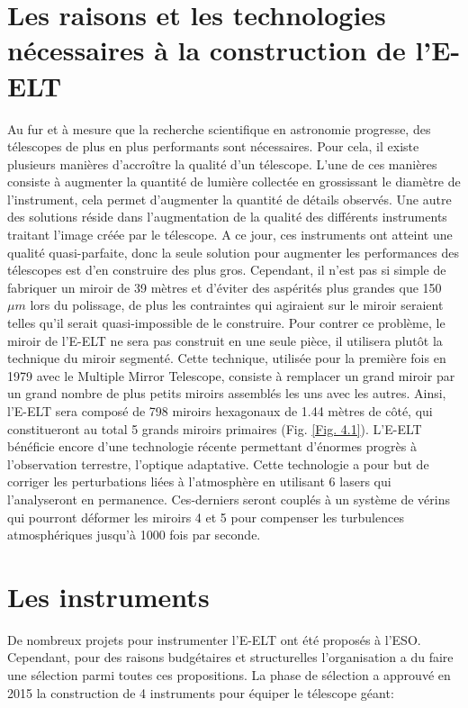 \section{Les raisons et les technologies nécessaires à la construction de l'E-ELT}\label{4.1}

Au fur et à mesure que la recherche scientifique en astronomie progresse, des télescopes de plus en plus performants sont nécessaires. Pour cela, il existe plusieurs manières d'accroître la qualité d'un télescope. L'une de ces manières consiste à augmenter la quantité de lumière collectée en grossissant le diamètre de l'instrument, cela permet d'augmenter la quantité de détails observés. Une autre des solutions réside dans l'augmentation de la qualité des différents instruments traitant l'image créée par le télescope. A ce jour, ces instruments ont atteint une qualité quasi-parfaite, donc la seule solution pour augmenter les performances des télescopes est d'en construire des plus gros. Cependant, il n'est pas si simple de fabriquer un miroir de 39 mètres et d'éviter des aspérités plus grandes que 150 $\mu m$ lors du polissage, de plus les contraintes qui agiraient sur le miroir seraient telles qu'il serait quasi-impossible de le construire. Pour contrer ce problème, le miroir de l'E-ELT ne sera pas construit en une seule pièce, il utilisera plutôt la technique du miroir segmenté. Cette technique, utilisée pour la première fois en 1979 avec le Multiple Mirror Telescope, consiste à remplacer un grand miroir par un grand nombre de plus petits miroirs assemblés les uns avec les autres. Ainsi, l'E-ELT sera composé de 798 miroirs hexagonaux de 1.44 mètres de côté, qui constitueront au total 5 grands miroirs primaires (Fig. \ref{Fig. 4.1}). L'E-ELT bénéficie encore d'une technologie récente permettant d'énormes progrès à l'observation terrestre, l'optique adaptative. Cette technologie a pour but de corriger les perturbations liées à l'atmosphère en utilisant 6 lasers qui l'analyseront en permanence. Ces-derniers seront couplés à un système de vérins qui pourront déformer les miroirs 4 et 5 pour compenser les turbulences atmosphériques jusqu'à 1000 fois par seconde.

\section{Les instruments}

De nombreux projets pour instrumenter l'E-ELT ont été proposés à l'ESO. Cependant, pour des raisons budgétaires et structurelles l'organisation a du faire une sélection parmi toutes ces propositions. La phase de sélection a approuvé en 2015 la construction de 4 instruments pour équiper le télescope géant:

